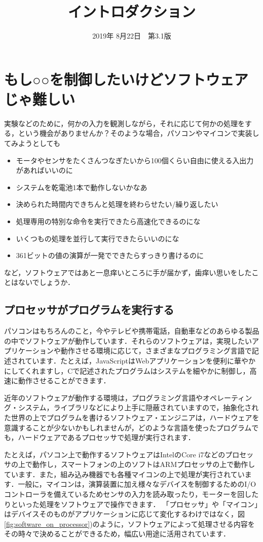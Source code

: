 \documentclass[a4paper,dvipdfmx]{jsarticle}
\begin{document}
\title{イントロダクション}
\author{}
\date{2019年 8月22日~~第3.1版}
\maketitle

\section{もし○○を制御したいけどソフトウェアじゃ難しい}
実験などのために，何かの入力を観測しながら，それに応じて何かの処理をする，という機会がありませんか？そのような場合，パソコンやマイコンで実装してみようとしても
\begin{itemize}
 \item モータやセンサをたくさんつなぎたいから100個くらい自由に使える入出力があればいいのに
 \item システムを乾電池1本で動作しないかなあ
 \item 決められた時間内できちんと処理を終わらせたい/繰り返したい
 \item 処理専用の特別な命令を実行できたら高速化できるのにな
 \item いくつもの処理を並行して実行できたらいいのにな
 \item 361ビットの値の演算が一発でできたらすっきり書けるのに
\end{itemize}
など，ソフトウェアではあと一息痒いところに手が届かず，歯痒い思いをしたことはないでしょうか．

\subsection{プロセッサがプログラムを実行する}
パソコンはもちろんのこと，今やテレビや携帯電話，自動車などのあらゆる製品の中でソフトウェアが動作しています．それらのソフトウェアは，実現したいアプリケーションや動作させる環境に応じて，さまざまなプログラミング言語で記述されています．たとえば，JavaScriptはWebアプリケーションを便利に華やかにしてくれますし，Cで記述されたプログラムはシステムを細やかに制御し，高速に動作させることができます．

近年のソフトウェアが動作する環境は，プログラミング言語やオペレーティング・システム，ライブラリなどにより上手に隠蔽されていますので，抽象化された世界の上でプログラムを書けるソフトウェア・エンジニアは，ハードウェアを意識することが少ないかもしれませんが，どのような言語を使ったプログラムでも，ハードウェアであるプロセッサで処理が実行されます．

たとえば，パソコン上で動作するソフトウェアはIntelのCore i7などのプロセッサの上で動作し，スマートフォンの上のソフトはARMプロセッサの上で動作しています．また，組み込み機器でも各種マイコンの上で処理が実行されています．一般に，マイコンは，演算装置に加え様々なデバイスを制御するためのI/Oコントローラを備えているためセンサの入力を読み取ったり，モーターを回したりといった処理をソフトウェアで操作できます．
「プロセッサ」や「マイコン」はデバイスそのものがアプリケーションに応じて変化するわけではなく，図\ref{fig:software_on_processor})のように，ソフトウェアによって処理させる内容をその時々で決めることができるため，幅広い用途に活用されています．
\end{document}
